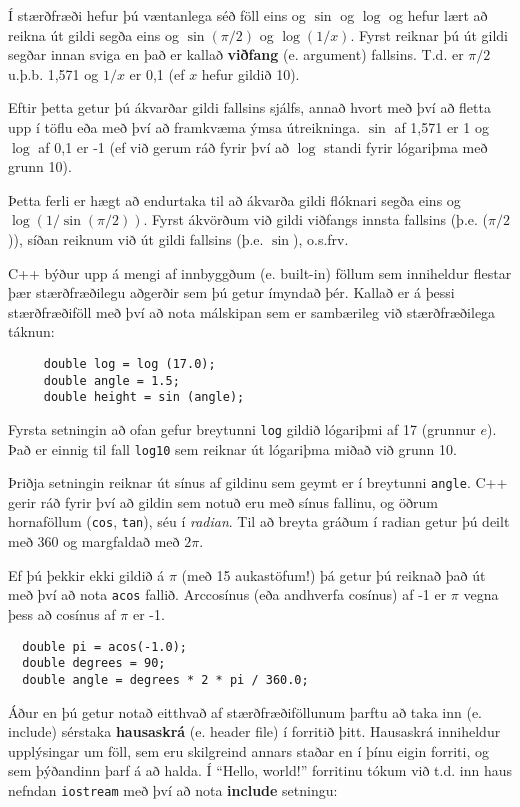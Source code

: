 Í stærðfræði hefur þú væntanlega séð föll eins og $\sin$ og $\log$ og hefur lært að reikna út gildi segða eins og $\sin(\pi/2)$ og $\log(1/x)$.
Fyrst reiknar þú út gildi segðar innan sviga en það er kallað {\bf viðfang} (e. argument) fallsins.
T.d. er $\pi/2$ u.þ.b. 1,571 og $1/x$ er 0,1 (ef $x$ hefur gildið 10).

Eftir þetta getur þú ákvarðar gildi fallsins sjálfs, annað hvort með því að fletta upp í töflu eða með því að framkvæma ýmsa útreikninga.
$\sin$ af 1,571 er 1 og $\log$ af 0,1 er -1 (ef við gerum ráð fyrir því að $\log$ standi fyrir 
lógariþma með grunn 10).

Þetta ferli er hægt að endurtaka til að ákvarða gildi flóknari segða eins og $\log(1/\sin(\pi/2))$.
Fyrst ákvörðum við gildi viðfangs innsta fallsins (þ.e. ($\pi/2$)), síðan reiknum við út gildi fallsins (þ.e. $\sin$), o.s.frv.

C++ býður upp á mengi af innbyggðum (e. built-in) föllum sem inniheldur flestar þær stærðfræðilegu aðgerðir sem þú getur ímyndað þér.
Kallað er á þessi stærðfræðiföll með því að nota málskipan sem er sambærileg við stærðfræðilega táknun: 

\begin{verbatim}
     double log = log (17.0);
     double angle = 1.5;
     double height = sin (angle);
\end{verbatim}
%

Fyrsta setningin að ofan gefur breytunni {\tt log} gildið lógariþmi af 17 (grunnur $e$).
Það er einnig til fall {\tt log10} sem reiknar út lógariþma miðað við grunn 10.

Þriðja setningin reiknar út sínus af gildinu sem geymt er í breytunni {\tt angle}.
C++ gerir ráð fyrir því að gildin sem notuð eru með sínus fallinu, og öðrum hornaföllum ({\tt cos}, {\tt tan}), séu í {\em radian}.
Til að breyta gráðum í radian getur þú deilt með 360 og margfaldað með $2 \pi$.  

Ef þú þekkir ekki gildið á $\pi$ (með 15 aukastöfum!) þá getur þú reiknað það út með því að nota {\tt acos} fallið.
Arccosínus (eða andhverfa cosínus) af -1 er $\pi$ vegna þess að cosínus af $\pi$ er -1.

\begin{verbatim}
  double pi = acos(-1.0);
  double degrees = 90;
  double angle = degrees * 2 * pi / 360.0;
\end{verbatim}
%
Áður en þú getur notað eitthvað af stærðfræðiföllunum þarftu að taka inn (e. include) sérstaka {\bf hausaskrá} (e. header file) í forritið þitt.
Hausaskrá inniheldur upplýsingar um föll, sem eru skilgreind annars staðar en í þínu eigin forriti, og sem þýðandinn þarf á að halda.
Í ``Hello, world!'' forritinu tókum við t.d. inn haus nefndan {\tt iostream} með því að nota {\bf include} setningu:

